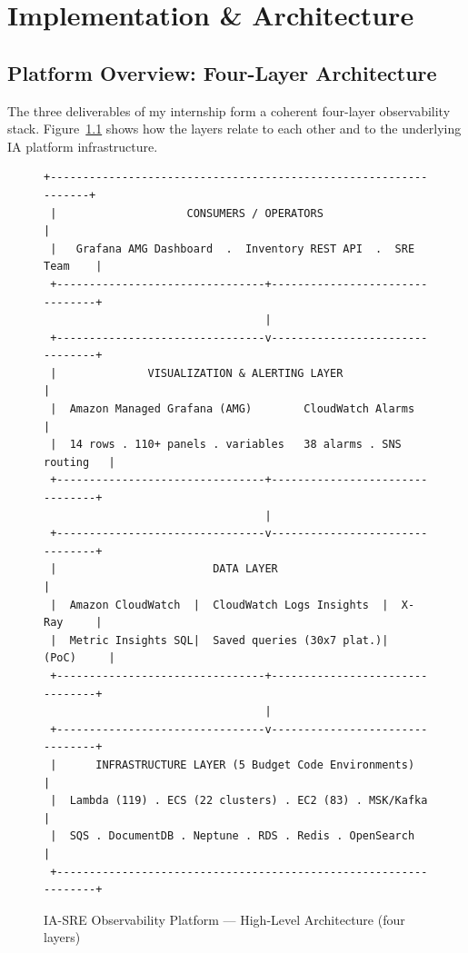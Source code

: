 
\chapter{Implementation \& Architecture}
\label{chap:implementation}

\section{Platform Overview: Four-Layer Architecture}
\label{sec:platform_overview}

The three deliverables of my internship form a coherent four-layer
observability stack. Figure~\ref{fig:platform_overview} shows how the layers
relate to each other and to the underlying IA platform infrastructure.

\begin{figure}[ht]
\centering
\begin{lstlisting}[language={}, basicstyle=\ttfamily\footnotesize, frame=none, backgroundcolor=\color{white}, numbers=none]
 +-----------------------------------------------------------------+
 |                    CONSUMERS / OPERATORS                        |
 |   Grafana AMG Dashboard  .  Inventory REST API  .  SRE Team    |
 +--------------------------------+--------------------------------+
                                  |
 +--------------------------------v--------------------------------+
 |              VISUALIZATION & ALERTING LAYER                    |
 |  Amazon Managed Grafana (AMG)        CloudWatch Alarms         |
 |  14 rows . 110+ panels . variables   38 alarms . SNS routing   |
 +--------------------------------+--------------------------------+
                                  |
 +--------------------------------v--------------------------------+
 |                        DATA LAYER                              |
 |  Amazon CloudWatch  |  CloudWatch Logs Insights  |  X-Ray     |
 |  Metric Insights SQL|  Saved queries (30x7 plat.)|  (PoC)     |
 +--------------------------------+--------------------------------+
                                  |
 +--------------------------------v--------------------------------+
 |      INFRASTRUCTURE LAYER (5 Budget Code Environments)         |
 |  Lambda (119) . ECS (22 clusters) . EC2 (83) . MSK/Kafka       |
 |  SQS . DocumentDB . Neptune . RDS . Redis . OpenSearch          |
 +-----------------------------------------------------------------+
\end{lstlisting}
\caption{IA-SRE Observability Platform --- High-Level Architecture (four layers)}
\label{fig:platform_overview}
\end{figure}


